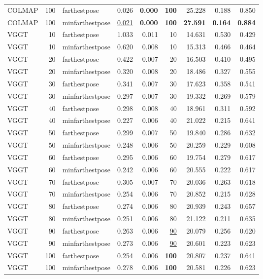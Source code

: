 \begin{table}[H]
\begin{tabular}{lrlrrrrrr}
COLMAP & 100 & farthestpose & 0.026 & \textbf{0.000} & \textbf{100} & 25.228 & 0.188 & 0.850 \\
COLMAP & 100 & minfarthestpose & \underline{0.021} & \textbf{0.000} & \textbf{100} & \textbf{27.591} & \textbf{0.164} & \textbf{0.884} \\
VGGT & 10 & farthestpose & 1.033 & 0.011 & 10 & 14.631 & 0.530 & 0.429 \\
VGGT & 10 & minfarthestpose & 0.620 & 0.008 & 10 & 15.313 & 0.466 & 0.464 \\
VGGT & 20 & farthestpose & 0.422 & 0.007 & 20 & 16.503 & 0.410 & 0.495 \\
VGGT & 20 & minfarthestpose & 0.320 & 0.008 & 20 & 18.486 & 0.327 & 0.555 \\
VGGT & 30 & farthestpose & 0.341 & 0.007 & 30 & 17.623 & 0.358 & 0.541 \\
VGGT & 30 & minfarthestpose & 0.297 & 0.007 & 30 & 19.332 & 0.269 & 0.579 \\
VGGT & 40 & farthestpose & 0.298 & 0.008 & 40 & 18.961 & 0.311 & 0.592 \\
VGGT & 40 & minfarthestpose & 0.227 & 0.006 & 40 & 21.022 & 0.215 & 0.641 \\
VGGT & 50 & farthestpose & 0.299 & 0.007 & 50 & 19.840 & 0.286 & 0.632 \\
VGGT & 50 & minfarthestpose & 0.248 & 0.006 & 50 & 20.259 & 0.229 & 0.608 \\
VGGT & 60 & farthestpose & 0.295 & 0.006 & 60 & 19.754 & 0.279 & 0.617 \\
VGGT & 60 & minfarthestpose & 0.242 & 0.006 & 60 & 20.555 & 0.222 & 0.617 \\
VGGT & 70 & farthestpose & 0.305 & 0.007 & 70 & 20.036 & 0.263 & 0.618 \\
VGGT & 70 & minfarthestpose & 0.254 & 0.006 & 70 & 20.852 & 0.215 & 0.628 \\
VGGT & 80 & farthestpose & 0.274 & 0.006 & 80 & 20.939 & 0.243 & 0.657 \\
VGGT & 80 & minfarthestpose & 0.251 & 0.006 & 80 & 21.122 & 0.211 & 0.635 \\
VGGT & 90 & farthestpose & 0.263 & 0.006 & \underline{90} & 20.079 & 0.256 & 0.620 \\
VGGT & 90 & minfarthestpose & 0.273 & 0.006 & \underline{90} & 20.601 & 0.223 & 0.623 \\
VGGT & 100 & farthestpose & 0.254 & 0.006 & \textbf{100} & 20.807 & 0.237 & 0.641 \\
VGGT & 100 & minfarthestpose & 0.278 & 0.006 & \textbf{100} & 20.581 & 0.226 & 0.623 \\
\bottomrule
\end{tabular}
\end{table}